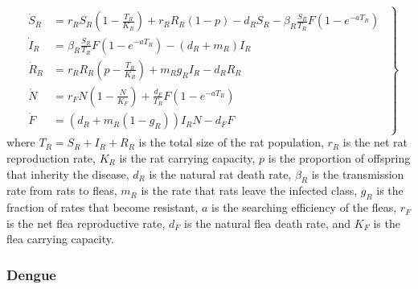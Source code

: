 \documentclass[12pt]{article}
\begin{document}
\begin{equation*}\left.\begin{gathered}\begin{aligned}
\dot{S}_R &= r_RS_R\left(1-\frac{T_R}{K_R} \right) + r_RR_R(1-p)-d_RS_R - \beta_R\frac{S_R}{T_R}F(1-e^{-aT_R}) \\
\dot{I}_R &= \beta_R\frac{S_R}{T_R}F(1-e^{-aT_R})-(d_R+m_R)I_R\\
\dot{R}_R &= r_RR_R\left(p-\frac{T_R}{K_R}\right) + m_Rg_RI_R -d_RR_R\\
\dot{N} &= r_FN\left(1-\frac{N}{K_F}\right) + \frac{d_F}{T_R}F(1-e^{-aT_R})\\
\dot{F} &= (d_R+m_R(1-g_R))I_RN-d_FF
\end{aligned}\end{gathered}\right\}\end{equation*}
%
where $T_R = S_R+I_R+R_R$ is the total size of the rat population, $r_R$ is the net rat reproduction rate, $K_R$ is the rat carrying capacity, $p$ is the proportion of offspring that inherity the disease, $d_R$ is the natural rat death rate, $\beta_R$ is the transmission rate from rats to fleas, $m_R$ is the rate that rats leave the infected class, $g_R$ is the fraction of rates that become resistant, $a$ is the searching efficiency of the fleas, $r_F$ is the net flea reproductive rate, $d_F$ is the natural flea death rate, and $K_F$ is the flea carrying capacity.

\subsubsection{Dengue}
\end{document}
